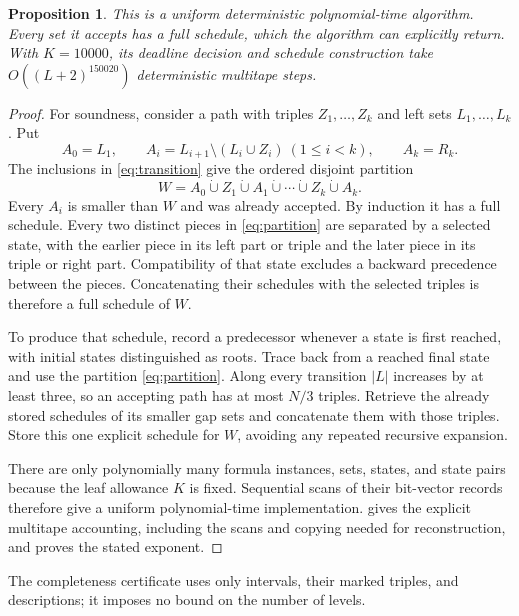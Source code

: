 \documentclass[11pt]{article}
\numberwithin{equation}{section}
\newtheorem{proposition}[theorem]{Proposition}
\theoremstyle{definition}
\theoremstyle{remark}
\newcommand{\dotcup}{\mathbin{\dot\cup}}
\begin{document}
\begin{proposition}\label{prop:algorithm}
This is a uniform deterministic polynomial-time algorithm. Every set it
accepts has a full schedule, which the algorithm can explicitly return.
With \(K=10000\), its deadline decision and schedule construction take
\(O((L+2)^{150020})\) deterministic multitape steps.
\end{proposition}
\begin{proof}
For soundness, consider a path with triples \(Z_1,\ldots,Z_k\) and
left sets \(L_1,\ldots,L_k\). Put
\[
 A_0=L_1,\qquad
 A_i=L_{i+1}\setminus(L_i\cup Z_i)\ (1\le i<k),\qquad
 A_k=R_k.
\]
The inclusions in \eqref{eq:transition} give the ordered disjoint partition
\begin{equation}
 W=A_0\dotcup Z_1\dotcup A_1\dotcup\cdots
       \dotcup Z_k\dotcup A_k.
 \label{eq:partition}
\end{equation}
Every \(A_i\) is smaller than \(W\) and was already accepted. By induction
it has a full schedule. Every two distinct pieces in \eqref{eq:partition}
are separated by a selected state, with the earlier piece in its left
part or triple and the later piece in its triple or right part.
Compatibility of that state excludes a backward precedence between
the pieces. Concatenating their schedules with the selected triples is
therefore a full schedule of \(W\).

To produce that schedule, record a predecessor whenever a state is
first reached, with initial states distinguished as roots. Trace back
from a reached final state and use the partition \eqref{eq:partition}.
Along every transition \(|L|\) increases by at least three, so an
accepting path has at most \(N/3\) triples. Retrieve the already stored
schedules of its smaller gap sets and concatenate them with those
triples. Store this one explicit schedule for \(W\), avoiding any
repeated recursive expansion.

There are only polynomially many formula instances, sets, states,
and state pairs because the leaf allowance $K$ is fixed. Sequential scans
of their bit-vector records therefore give a uniform polynomial-time
implementation.  gives the explicit multitape
accounting, including the scans and copying needed for reconstruction,
and proves the stated exponent.
\end{proof}

The completeness certificate uses only intervals, their marked triples,
and descriptions; it imposes no bound on the number of levels.
\end{document}
